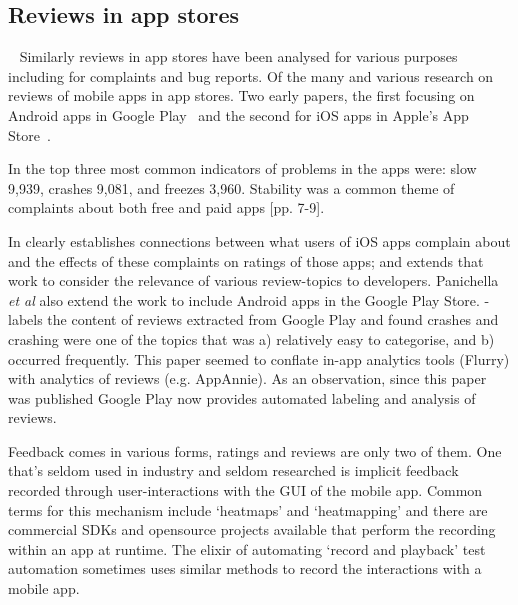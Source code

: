 \subsection{Reviews in app stores}~\label{rw-reviews-in-app-stores}
Similarly reviews in app stores have been analysed for various purposes including for complaints and bug reports. Of the many and various research on reviews of mobile apps in app stores. 
Two early papers, the first focusing on Android apps in Google Play~\textcite{fu2013_why_people_hate_your_app_making_sense_of_user_feedback_in_a_mobile_app_store} and the second for iOS apps in Apple's App Store~\textcite{khalid2015_what_do_mobile_app_users_complain_about}.

In \textcite[p. 5][]{fu2013_why_people_hate_your_app_making_sense_of_user_feedback_in_a_mobile_app_store} the top three most common indicators of problems in the apps were: slow 9,939, crashes 9,081, and freezes 3,960. Stability was a common theme of complaints about both free and paid apps [pp. 7-9]. 

In \textcite{khalid2015_what_do_mobile_app_users_complain_about} clearly establishes connections between what users of iOS apps complain about and the effects of these complaints on ratings of those apps; and \textcite{panichella2015_how_can_i_improve_my_app_classifying_user_reviews_for_sw_maintenance_and_evolution} extends that work to consider the relevance of various review-topics to developers. Panichella \emph{et al} also extend the work to include Android apps in the Google Play Store. \textcite{mcilroy2016_analyzing_and_automatically_labelling_the_types_of_user_issues_raised_in_mobile_app_reviews} - labels the content of reviews extracted from Google Play and found crashes and crashing were one of the topics that was a) relatively easy to categorise, and b) occurred frequently. This paper seemed to conflate in-app analytics tools (Flurry) with analytics of reviews (e.g. AppAnnie). As an observation, since this paper was published Google Play now provides automated labeling and analysis of reviews.

Feedback comes in various forms, ratings and reviews are only two of them.  One that's seldom used in industry and seldom researched is implicit feedback recorded through user-interactions with the GUI of the mobile app. Common terms for this mechanism include `heatmaps' and `heatmapping' and there are commercial SDKs and opensource projects available that perform the recording within an app at runtime. The elixir of automating `record and playback' test automation sometimes uses similar methods to record the interactions with a mobile app. 

